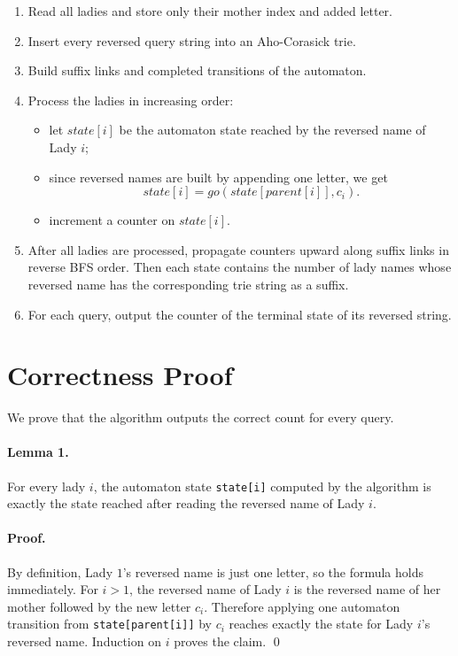 \documentclass[11pt]{article}
\begin{document}
\begin{enumerate}[leftmargin=*]
    \item Read all ladies and store only their mother index and added letter.
    \item Insert every reversed query string into an Aho-Corasick trie.
    \item Build suffix links and completed transitions of the automaton.
    \item Process the ladies in increasing order:
    \begin{itemize}[leftmargin=*]
        \item let $state[i]$ be the automaton state reached by the reversed name of Lady $i$;
        \item since reversed names are built by appending one letter, we get
        \[
        state[i] = go(state[parent[i]], c_i).
        \]
        \item increment a counter on $state[i]$.
    \end{itemize}
    \item After all ladies are processed, propagate counters upward along suffix links in reverse BFS order. Then each state contains the number of lady names whose reversed name has the corresponding trie string as a suffix.
    \item For each query, output the counter of the terminal state of its reversed string.
\end{enumerate}

\section*{Correctness Proof}

We prove that the algorithm outputs the correct count for every query.

\paragraph{Lemma 1.}
For every lady $i$, the automaton state \texttt{state[i]} computed by the algorithm is exactly the state reached after reading the reversed name of Lady $i$.

\paragraph{Proof.}
By definition, Lady $1$'s reversed name is just one letter, so the formula holds immediately. For $i > 1$, the reversed name of Lady $i$ is the reversed name of her mother followed by the new letter $c_i$. Therefore applying one automaton transition from \texttt{state[parent[i]]} by $c_i$ reaches exactly the state for Lady $i$'s reversed name. Induction on $i$ proves the claim. \qed
\end{document}
